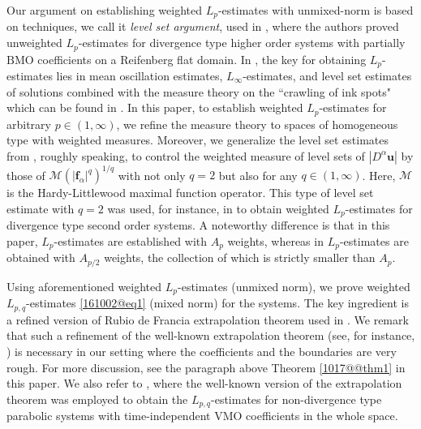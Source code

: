 \documentclass[reqno]{amsart}
\numberwithin{equation}{section}
\theoremstyle{plain}
\theoremstyle{definition}
\theoremstyle{remark}
\begin{document}
Our argument on establishing weighted $L_p$-estimates with unmixed-norm is based on  techniques, we call it \emph{level set argument}, used in \cite{MR2835999}, where the authors proved unweighted $L_p$-estimates for divergence type higher order systems with partially ${\mathrm{BMO}}$ coefficients on a Reifenberg flat domain.
In \cite{MR2835999}, the key for obtaining $L_p$-estimates lies in mean oscillation estimates, $L_\infty$-estimates, and level set estimates of solutions combined with  the measure theory on the ``crawling of ink spots" which can be found in \cite{MR563790}.
In this paper, to establish weighted $L_{p}$-estimates for arbitrary $p\in (1,\infty)$, we refine the measure theory  to  spaces of homogeneous type with weighted measures.
Moreover, we generalize the level set estimates from \cite{MR2835999}, roughly speaking, to control the weighted measure of  level sets of $|D^\alpha {\boldsymbol{u}}|$ by those of ${\mathcal{M}}(|{\boldsymbol{f}}_\alpha|^q)^{1/q}$ with not only $q=2$ but also for any $q\in (1,\infty)$.
Here, ${\mathcal{M}}$ is the Hardy-Littlewood maximal function operator.
This type of level set estimate with $q=2$ was used, for instance, in \cite{MR3225808, MR3467697} to obtain weighted $L_p$-estimates for divergence type second order systems.
A noteworthy difference is that in this paper, $L_p$-estimates are established with $A_p$ weights, whereas in \cite{MR3225808, MR3467697}  $L_p$-estimates are obtained with $A_{p/2}$ weights, the collection of which is strictly smaller than $A_p$.

Using aforementioned weighted $L_p$-estimates (unmixed norm), we prove weighted $L_{p,q}$-estimates  \eqref{161002@eq1} (mixed norm) for the systems.
The key ingredient  is a refined version of Rubio de Francia extrapolation theorem used in \cite{arXiv:1603.07844v1}.
We remark that such a refinement of the well-known extrapolation theorem (see, for instance, \cite{MR2797562}) is necessary in our setting where the coefficients and the boundaries are very rough.
For more discussion, see the  paragraph above Theorem \ref{1017@@thm1} in this paper.
We also refer to \cite{MR2286441}, where the well-known version of the extrapolation theorem  was employed to obtain the $L_{p,q}$-estimates for non-divergence type parabolic systems with  time-independent ${\mathrm{VMO}}$ coefficients in the whole space.
\end{document}
